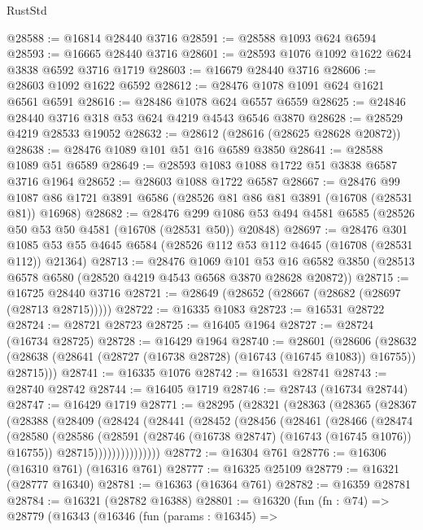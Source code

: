 \begin{lexlean}{RustStd}
\begin{coremodule}
@28588 := @16814 @28440 @3716
@28591 := @28588 @1093 @624 @6594
@28593 := @16665 @28440 @3716
@28601 := @28593 @1076 @1092 @1622 @624 @3838 @6592 @3716 @1719
@28603 := @16679 @28440 @3716
@28606 := @28603 @1092 @1622 @6592
@28612 := @28476 @1078 @1091 @624 @1621 @6561 @6591
@28616 := @28486 @1078 @624 @6557 @6559
@28625 := @24846 @28440 @3716 @318 @53 @624 @4219 @4543 @6546 @3870
@28628 := @28529 @4219 @28533 @19052
@28632 := @28612 (@28616 (@28625 @28628 @20872))
@28638 := @28476 @1089 @101 @51 @16 @6589 @3850
@28641 := @28588 @1089 @51 @6589
@28649 := @28593 @1083 @1088 @1722 @51 @3838 @6587 @3716 @1964
@28652 := @28603 @1088 @1722 @6587
@28667 := @28476
    @99
    @1087
    @86
    @1721
    @3891
    @6586
    (@28526 @81 @86 @81 @3891 (@16708 (@28531 @81)) @16968)
@28682 := @28476
    @299
    @1086
    @53
    @494
    @4581
    @6585
    (@28526 @50 @53 @50 @4581 (@16708 (@28531 @50)) @20848)
@28697 := @28476
    @301
    @1085
    @53
    @55
    @4645
    @6584
    (@28526 @112 @53 @112 @4645 (@16708 (@28531 @112)) @21364)
@28713 := @28476
    @1069
    @101
    @53
    @16
    @6582
    @3850
    (@28513 @6578 @6580 (@28520 @4219 @4543 @6568 @3870 @28628 @20872))
@28715 := @16725 @28440 @3716
@28721 := @28649 (@28652 (@28667 (@28682 (@28697 (@28713 @28715)))))
@28722 := @16335 @1083
@28723 := @16531 @28722
@28724 := @28721 @28723
@28725 := @16405 @1964
@28727 := @28724 (@16734 @28725)
@28728 := @16429 @1964
@28740 := @28601
    (@28606
      (@28632 (@28638 (@28641 (@28727 (@16738 @28728) (@16743 (@16745 @1083)) @16755)) @28715)))
@28741 := @16335 @1076
@28742 := @16531 @28741
@28743 := @28740 @28742
@28744 := @16405 @1719
@28746 := @28743 (@16734 @28744)
@28747 := @16429 @1719
@28771 := @28295
    (@28321
      (@28363
        (@28365
          (@28367
            (@28388
              (@28409
                (@28424
                  (@28441
                    (@28452
                      (@28456
                        (@28461
                          (@28466
                            (@28474
                              (@28580
                                (@28586
                                  (@28591 (@28746 (@16738 @28747) (@16743 (@16745 @1076)) @16755))
                                  @28715)))))))))))))))
@28772 := @16304 @761
@28776 := @16306 (@16310 @761) (@16316 @761)
@28777 := @16325 @25109
@28779 := @16321 (@28777 @16340)
@28781 := @16363 (@16364 @761)
@28782 := @16359 @28781
@28784 := @16321 (@28782 @16388)
@28801 := @16320
    (fun (fn : @74) =>
    @28779
      (@16343
        (@16346
          (fun (params : @16345) =>

\end{coremodule}
\end{lexlean}
